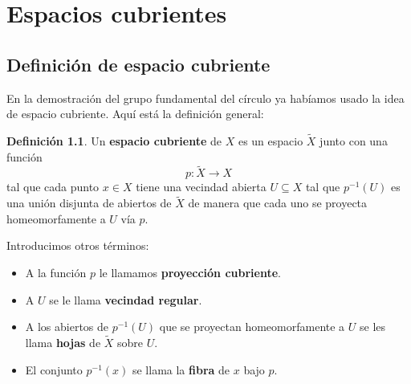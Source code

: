 \documentclass[spanish]{book}
\theoremstyle{definition}
\newtheorem*{defn}{Definición}
\begin{document}
\chapter{Espacios cubrientes}
\section{Definición de espacio cubriente}
En la demostración del grupo fundamental del círculo ya habíamos usado la idea de espacio cubriente. Aquí está la definición general:
\begin{defn}
	Un \textbf{espacio cubriente} de $X$ es un espacio $\tilde X$ junto con una función \[p:\tilde X\to X\] tal que cada punto $x\in X$ tiene una vecindad abierta $U\subseteq X$ tal que $p^{-1}(U)$ es una unión disjunta de abiertos de $\tilde X$ de manera que cada uno se proyecta homeomorfamente a $U$ vía $p$.
\end{defn}
\begin{figure}
\vspace{-2.6cm}
\end{figure}
	Introducimos otros términos:
	\begin{itemize}
		\item A la función $p$ le llamamos \textbf{proyección cubriente}.
		\item A $U$ se le llama \textbf{vecindad regular}.
		\item A los abiertos de $p^{-1}(U)$ que se proyectan homeomorfamente a $U$ se les llama \textbf{hojas} de $\tilde X$ sobre $U$.
		\item El conjunto $p^{-1}(x)$ se llama la \textbf{fibra} de $x$ bajo $p$.
	\end{itemize}
\end{document}
